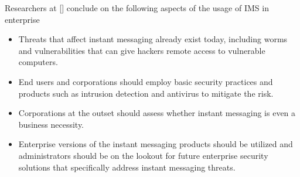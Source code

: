 %
Researchers at [\cite{hindocha2003malicious}] conclude on the following aspects of the usage of IMS in enterprise

\begin{itemize}
    \item Threats that affect instant messaging already exist today, including worms and vulnerabilities that can
    give hackers remote access to vulnerable computers.
    \item End users and corporations should employ basic security practices and products such as
    intrusion detection and antivirus to mitigate the risk.
    \item Corporations at the outset should assess whether instant messaging is even a business necessity.
    \item Enterprise versions of
    the instant messaging products should be utilized and administrators should be on the lookout for
    future enterprise security solutions that specifically address instant messaging threats.
\end{itemize}
